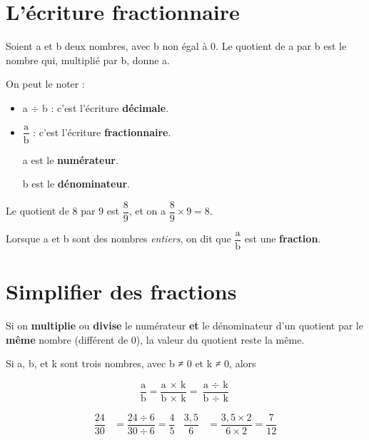 \documentclass[../€Cours-complet/Cours-complet]{subfiles}
\begin{document}
\maketitleCours

\section{L'écriture fractionnaire}

\begin{cours}
	Soient a et b deux nombres, avec b non égal à 0. Le quotient de a par b est le nombre qui, multiplié par b, donne a.

	On peut le noter :
	\begin{itemize}
		\item a $÷$ b : c'est l'écriture \textbf{décimale}.
		\item $\dfrac{\text{a}}{\text{b}}$ : c'est l'écriture \textbf{fractionnaire}.

		      a est le \textbf{numérateur}.

		      b est le \textbf{dénominateur}.
	\end{itemize}
\end{cours}


\begin{exemple}
	Le quotient de 8 par 9 est $\dfrac{8}{9}$, et on a $\dfrac{8}{9} × 9 = 8$.
\end{exemple}

\begin{cours}[Fractions]
	Lorsque a et b sont des nombres \textit{entiers}, on dit que $\dfrac{\text{a}}{\text{b}}$ est une \textbf{fraction}.
\end{cours}

\section{Simplifier des fractions}

\begin{cours}
	Si on \textbf{multiplie} ou \textbf{divise} le numérateur \textbf{et} le dénominateur d'un quotient par le \textbf{même} nombre (différent de 0), la valeur du quotient reste la même.

	Si a, b, et k sont trois nombres, avec b ≠ 0 et k ≠ 0, alors

	$$ \dfrac{\text{a}}{\text{b}} = \dfrac{\text{a × k}}{\text{b × k}} = \dfrac{\text{a }÷\text{ k}}{\text{b }÷\text{ k}} $$
\end{cours}

\begin{exemple}
	\begin{align*}
		\dfrac{24}{30} & = \dfrac{24 ÷ 6}{30 ÷ 6} = \dfrac{4}{5}  &
		\dfrac{3,5}{6} & = \dfrac{3,5 × 2}{6 × 2} = \dfrac{7}{12}
	\end{align*}
\end{exemple}
\end{document}
